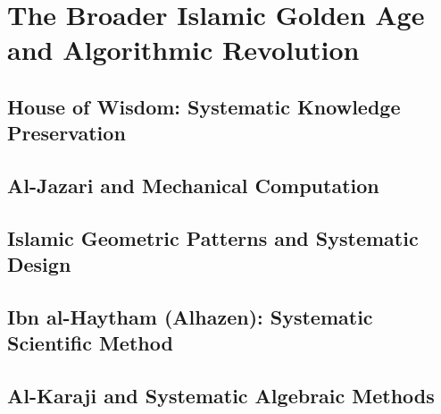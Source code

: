 

\chapter{The Broader Islamic Golden Age and Algorithmic Revolution}

\section{House of Wisdom: Systematic Knowledge Preservation}

\section{Al-Jazari and Mechanical Computation}

\section{Islamic Geometric Patterns and Systematic Design}

\section{Ibn al-Haytham (Alhazen): Systematic Scientific Method}

\section{Al-Karaji and Systematic Algebraic Methods}
